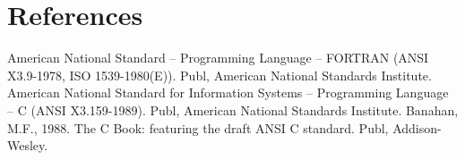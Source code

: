 \documentclass[twoside,11pt]{article}
\newcommand{\xlabel}[1]{}
\renewcommand{\_}{\texttt{\symbol{95}}}
\begin{document}
\section{\xlabel{references}References}

\begin{thebibliography}{9}
American National Standard -- Programming Language 
-- FORTRAN (ANSI X3.9-1978, ISO 1539-1980(E)). Publ, American National 
Standards Institute.
%
American National Standard for Information Systems --
Programming Language -- C (ANSI X3.159-1989). Publ, American National 
Standards Institute.
Banahan, M.F., 1988. The C Book: featuring the draft ANSI C
standard. Publ, Addison-Wesley.
\end{thebibliography}
\end{document}
